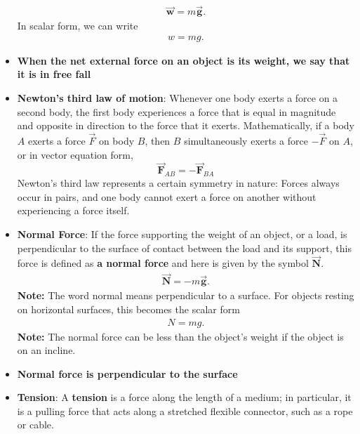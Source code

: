 \documentclass{report}
\begin{document}
\begin{itemize}
\begin{align*}
                    \vec{\mathbf{w}} = m\vec{\mathbf{g}}
                .\end{align*}
                In scalar form, we can write
                \begin{align*}
                    w = mg
                .\end{align*}
            \item \textbf{When the net external force on an object is its weight, we say that it is in free fall}
            \item \textbf{Newton's third law of motion}:
                Whenever one body exerts a force on a second body, the first body experiences a force that is equal in magnitude and opposite in direction to the force that it exerts. Mathematically, if a body $A$ exerts a force $\vec{F}$ on body $B$, then $B$ simultaneously exerts a force $-\vec{F}$ on $A$, or in vector equation form,
                \[
                    \vec{\mathbf{F}}_{AB} = -\vec{\mathbf{F}}_{BA}
                \]
                \bigbreak \noindent 
                Newton’s third law represents a certain symmetry in nature: Forces always occur in pairs, and one body cannot exert a force on another without experiencing a force itself.
            \item  \textbf{Normal Force}: If the force supporting the weight of an object, or a load, is perpendicular to the surface of contact between the load and its support, this force is defined as \textbf{a normal force} and here is given by the symbol $\vec{\mathbf{N}}$.
                \begin{align*}
                    \vec{\mathbf{N}} = -m\vec{\mathbf{g}}
                .\end{align*}
                \textbf{Note:} The word normal means perpendicular to a surface.
                \bigbreak \noindent 
                For objects resting on horizontal surfaces, this becomes the scalar form 
                \begin{align*}
                    N = mg
                .\end{align*}
                \bigbreak \noindent 
                \textbf{Note:} The normal force can be less than the object’s weight if the object is on an incline.
            \item \textbf{Normal force is perpendicular to the surface}
            \item \textbf{Tension}: A \textbf{tension} is a force along the length of a medium; in particular, it is a pulling force that acts along a stretched flexible connector, such as a rope or cable.

\end{itemize}
\end{document}
